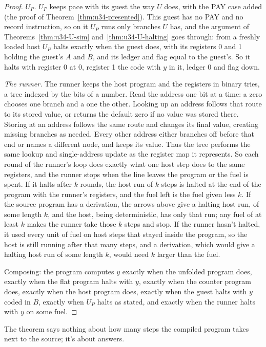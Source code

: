 \documentclass[11pt,twoside]{article}
\theoremstyle{thielethm}
\theoremstyle{thieledef}
\theoremstyle{thieledef}
\theoremstyle{thieledef}
\theoremstyle{thielethm}
\theoremstyle{thieleobs}
\theoremstyle{thielethm}
\begin{document}
\begin{proof}
\emph{$U_P$.} $U_P$ keeps pace with its guest the way $U$ does, with the PAY case added (the proof of Theorem~\ref{thm:u34-presented}). This guest has no PAY and no record instruction, so on it $U_P$ runs only branches $U$ has, and the argument of Theorems~\ref{thm:u34-U-sim} and~\ref{thm:u34-U-halting} goes through: from a freshly loaded host $U_P$ halts exactly when the guest does, with its registers 0 and 1 holding the guest's $A$ and $B$, and its
ledger and flag equal to the guest's. So it halts with register 0 at 0, register 1 the code with
$y$ in it, ledger 0 and flag down.

\emph{The runner.} The runner keeps the host program and the registers in binary tries, a tree
indexed by the bits of a number. Read the address one bit at a time: a zero chooses one branch and a one
the other. Looking up an address follows that route to its stored value,
or returns the default zero if no value was stored there. Storing at an
address follows the same route and changes its final value, creating missing
branches as needed. Every other address either branches off before that end
or names a different node, and keeps its value. Thus the tree performs the
same lookup and single-address update as the register map it represents. So each round of the runner's loop does
exactly what one host step does to the same registers, and the runner stops when the line leaves
the program or the fuel is spent. If it halts after $k$ rounds, the host run of $k$ steps is
halted at the end of the program with the runner's registers, and the fuel left is the fuel given
less $k$. If the source program has a derivation, the arrows above give a halting host run, of
some length $k$, and the host, being deterministic, has only that run; any fuel of at least $k$
makes the runner take those $k$ steps and stop. If the runner hasn't halted, it used every unit of
fuel on host steps that stayed inside the program, so the host is still running after that many
steps, and a derivation, which would give a halting host run of some length $k$, would need $k$
larger than the fuel.

Composing: the program computes $y$ exactly when the unfolded program does, exactly when the flat
program halts with $y$, exactly when the counter program does, exactly when the host program does,
exactly when the guest halts with $y$ coded in $B$, exactly when $U_P$ halts as stated, and exactly
when the runner halts with $y$ on some fuel.
\end{proof}

The theorem says nothing about how many steps the compiled program takes next to the source; it's
about answers.
\end{document}
